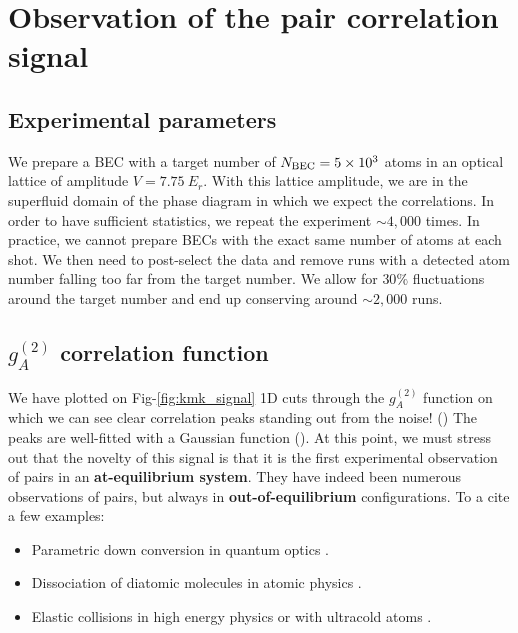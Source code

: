 \section{Observation of the pair correlation signal}

\subsection{Experimental parameters}
\label{sec:post_selec}

We prepare a BEC with a target number of $N_{\rm{BEC}}=5 \times 10^3$ atoms in an optical lattice of amplitude $V=7.75 \ E_r$. With this lattice amplitude, we are in the superfluid domain of the phase diagram in which we expect the \kmk correlations. In order to have sufficient statistics, we repeat the experiment $\sim 4,000$ times. In practice, we cannot prepare BECs with the exact same number of atoms at each shot. We then need to post-select the data and remove runs with a detected atom number falling too far from the target number. We allow for $30 \%$ fluctuations around the target number and end up conserving around $\sim 2,000$ runs.

\subsection{$g^{(2)}_A$ correlation function}

We have plotted on Fig-\ref{fig:kmk_signal} 1D cuts through the $g_{A}^{(2)}$ function on which we can see clear correlation peaks standing out from the noise! () The peaks are well-fitted with a Gaussian function (). At this point, we must stress out that the novelty of this signal is that it is the first experimental observation of \kmk pairs in an \textbf{at-equilibrium system}. They have indeed been numerous observations of \kmk pairs, but always in \textbf{out-of-equilibrium} configurations. To a cite a few examples:

\begin{itemize}
    \item Parametric down conversion in quantum optics \cite{burnham1970}.
    \item Dissociation of diatomic molecules in atomic physics \cite{greiner2005}.
    \item Elastic collisions in high energy physics \cite{arnison1982} or with ultracold atoms \cite{perrin2007observation}.
\end{itemize}

